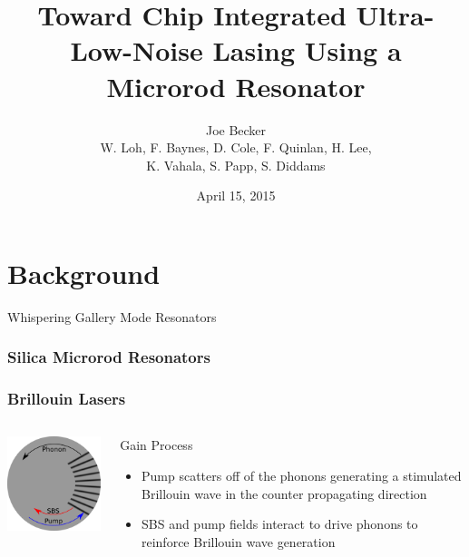 \documentclass{beamer}
\title[Microrod Lasing]{Toward Chip Integrated Ultra-Low-Noise Lasing Using a Microrod Resonator} %
\author[J. Becker]{Joe Becker \\
\scriptsize{W. Loh, F. Baynes, D. Cole, F. Quinlan, H. Lee,\\
K. Vahala, S. Papp, S. Diddams}} %
\institute[NIST] %
{
National Institute of Standards and Technology\\ %
\medskip
\textit{Joe.Becker@nist.gov} %
}
\date{April 15, 2015} %
\begin{document}
\begin{frame}
\titlepage %
\end{frame}




\section{Background} 
\begin{frame}{Whispering Gallery Mode Resonators}
\end{frame}

\begin{frame}\frametitle{Silica Microrod Resonators}
\end{frame}

\begin{frame}\frametitle{Brillouin Lasers}
\begin{columns}
\includegraphics[width=5cm,keepaspectratio]{Images/SBS_Figure.png}

\begin{block}{Gain Process}
\begin{itemize}
\item Pump scatters off of the phonons generating a stimulated Brillouin wave in the counter propagating direction 
\item SBS and pump fields interact to drive phonons to reinforce Brillouin wave generation
\end{itemize}
\end{block}

\end{columns}
\end{frame}
\end{document}
